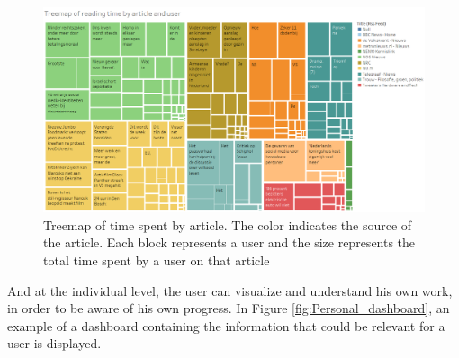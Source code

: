 \begin{figure}[h]
	\centering
	\includegraphics[width=1\linewidth]{gfx/Treemap_by_article}
	\caption{Treemap of time spent by article. The color indicates the source of the article. Each block represents a user and the size represents the total time spent by a user on that article}
	\label{fig:treemap_by_article}
\end{figure}

%

And at the individual level, the user can visualize and understand his own work, in order to be aware of his own progress. In Figure \ref{fig:Personal_dashboard}, an example of a dashboard containing the information that could be relevant for a user is displayed.

